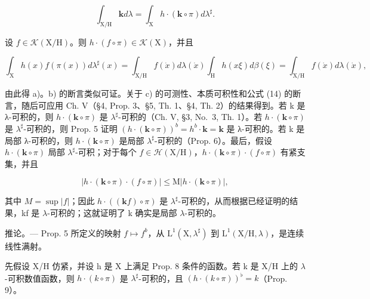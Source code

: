 \[
\int_ {\mathrm{X} / \mathrm{H}} \mathbf {k} d \lambda = \int_ {\mathrm{X}} h \cdot (\mathbf {k} \circ \pi) d \lambda^ {\sharp}.\tag{14}
\]

设 \(f \in \mathcal{K}(\mathrm{X}/\mathrm{H})\)。则 \(h \cdot (f \circ \pi) \in \mathcal{K}(\mathrm{X})\)，并且

\[
\int_ {\mathrm{X}} h (x) f (\pi (x)) d \lambda^ {\sharp} (x) = \int_ {\mathrm{X} / \mathrm{H}} f (\dot {x}) d \lambda (\dot {x}) \int_ {\mathrm{H}} h (x \xi) d \beta (\xi) = \int_ {\mathrm{X} / \mathrm{H}} f (\dot {x}) d \lambda (\dot {x}),
\]

由此得 a)。b) 的断言类似可证。关于 c) 的可测性、本质可积性和公式 (14) 的断言，随后可应用 Ch. V（§4, Prop. 3、§5, Th. 1、§4, Th. 2）的结果得到。若 k 是 λ-可积的，则 \(h \cdot (\mathbf{k} \circ \pi)\) 是 \(\lambda^{\sharp}\)-可积的（Ch. V, §3, No.~3, Th. 1）。若 \(h \cdot (\mathbf{k} \circ \pi)\) 是 \(\lambda^{\sharp}\)-可积的，则 Prop. 5 证明 \((h \cdot (\mathbf{k} \circ \pi))^b = h^b \cdot \mathbf{k} = \mathbf{k}\) 是 λ-可积的。若 k 是局部 λ-可积的，则 \(h \cdot (\mathbf{k} \circ \pi)\) 是局部 \(\lambda^{\sharp}\)-可积的（Prop. 6）。最后，假设 \(h \cdot (\mathbf{k} \circ \pi)\) 局部 \(\lambda^{\sharp}\)-可积；对于每个 \(f \in \mathcal{H}(\mathrm{X}/\mathrm{H})\)，\(h \cdot (\mathbf{k} \circ \pi) \cdot (f \circ \pi)\) 有紧支集，并且

\[
\left| h \cdot (\mathbf {k} \circ \pi) \cdot (f \circ \pi) \right| \leqslant \mathrm{M} \left| h \cdot (\mathbf {k} \circ \pi) \right|,
\]

其中 \(M = \sup |f|\)；因此 \(h \cdot ((\mathbf{k}f) \circ \pi)\) 是 \(\lambda^{\sharp}\)-可积的，从而根据已经证明的结果，kf 是 \(\lambda\)-可积的；这就证明了 k 确实是局部 \(\lambda\)-可积的。

推论。--- Prop. 5 所定义的映射 \(f \mapsto f^{b}\)，从 \(\mathrm{L}^{1}(\mathrm{X}, \lambda^{\sharp})\) 到 \(\mathrm{L}^{1}(\mathrm{X}/\mathrm{H}, \lambda)\)，是连续线性满射。

先假设 X/H 仿紧，并设 h 是 X 上满足 Prop. 8 条件的函数。若 k 是 X/H 上的 \(\lambda\)-可积数值函数，则 \(h \cdot (k \circ \pi)\) 是 \(\lambda^{\sharp}\)-可积的，且 \((h \cdot (k \circ \pi))^{\flat} = k\)（Prop. 9）。


